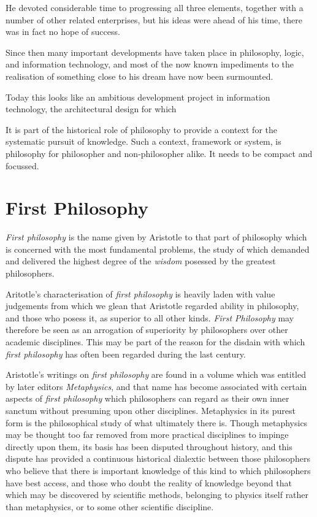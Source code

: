 He devoted considerable time to progressing all three elements, together with a number of other related enterprises, but his ideas were ahead of his time, there was in fact no hope of success.

Since then many important developments have taken place in philosophy, logic, and information technology, and most of the now known impediments to the realisation of something close to his dream have now been surmounted.

Today this looks like an ambitious development project in information technology, the architectural design for which 








It is part of the historical role of philosophy to provide a context for the systematic pursuit of knowledge.
Such a context, framework or system, is philosophy for philosopher and non-philosopher alike.
It needs to be compact and focussed.

\section{First Philosophy}

{\it First philosophy} is the name given by Aristotle to that part of philosophy which is concerned with the most fundamental problems, the study of which demanded and delivered the highest degree of the {\it wisdom} posessed by the greatest philosophers.

Aritotle's characterisation of {\it first philosophy} is heavily laden with value judgements from which we glean that Aristotle regarded ability in philosophy, and those who posess it, as superior to all other kinds.
{\it First Philosophy} may therefore be seen as an arrogation of superiority by philosophers over other academic disciplines.
This may be part of the reason for the disdain with which {\it first philosophy} has often been regarded during the last century.

Aristotle's writings on {\it first philosophy} are found in a volume which was entitled by later editors {\it Metaphysics}, and that name has become associated with certain aspects of {\it first philosophy} which philosophers can regard as their own inner sanctum without presuming upon other disciplines.
Metaphysics in its purest form is the philosophical study of what ultimately there is.
Though metaphysics may be thought too far removed from more practical disciplines to impinge directly upon them, its basis has been disputed throughout history, and this dispute has provided a continuous historical dialextic between those philosophers who believe that there is important knowledge of this kind to which philosophers have best access, and those who doubt the reality of knowledge beyond that which may be discovered by scientific methods, belonging to physics itself rather than metaphysics, or to some other scientific discipline.

